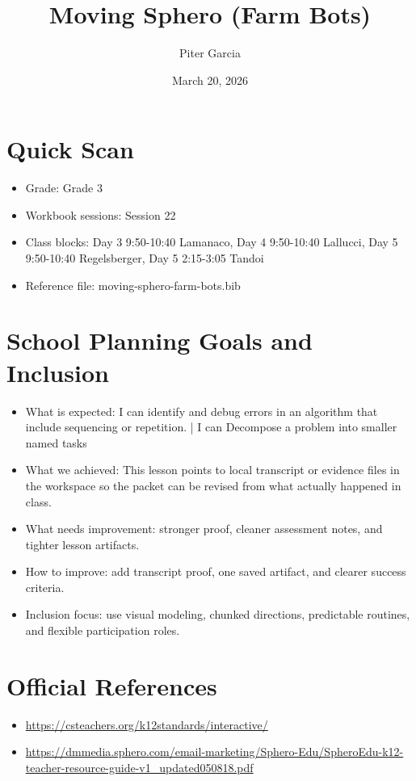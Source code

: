 \documentclass[11pt]{article}
\title{Moving Sphero (Farm Bots)}
\author{Piter Garcia}
\date{March 20, 2026}
\begin{document}
    \maketitle
    \section*{Quick Scan}
    \begin{itemize}[leftmargin=*]
    \item Grade: Grade 3
    \item Workbook sessions: Session 22
    \item Class blocks: Day 3 9:50-10:40 Lamanaco, Day 4 9:50-10:40 Lallucci, Day 5 9:50-10:40 Regelsberger, Day 5 2:15-3:05 Tandoi
    \item Reference file: moving-sphero-farm-bots.bib
    \end{itemize}
    \section*{School Planning Goals and Inclusion}
    \begin{itemize}[leftmargin=*]
    \item What is expected: I can identify and debug errors in an algorithm that include sequencing or repetition. | I can Decompose a problem into smaller named tasks
    \item What we achieved: This lesson points to local transcript or evidence files in the workspace so the packet can be revised from what actually happened in class.
    \item What needs improvement: stronger proof, cleaner assessment notes, and tighter lesson artifacts.
    \item How to improve: add transcript proof, one saved artifact, and clearer success criteria.
    \item Inclusion focus: use visual modeling, chunked directions, predictable routines, and flexible participation roles.
    \end{itemize}
    \section*{Official References}
    \begin{itemize}[leftmargin=*]
    \item \url{https://csteachers.org/k12standards/interactive/}
\item \url{https://dmmedia.sphero.com/email-marketing/Sphero-Edu/SpheroEdu-k12-teacher-resource-guide-v1_updated050818.pdf}

    \end{itemize}
    
\end{document}
